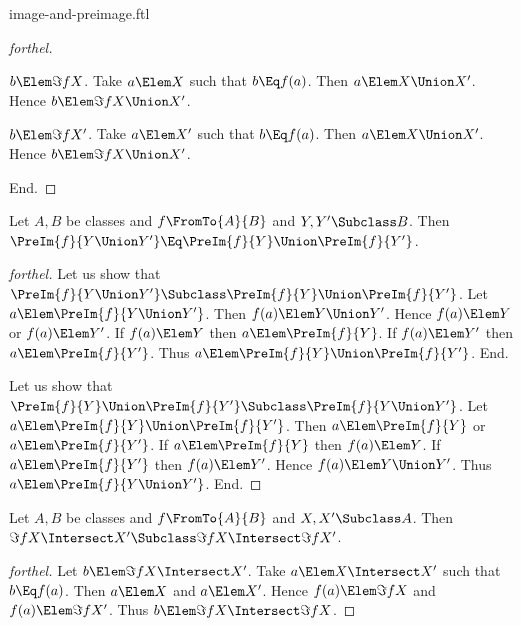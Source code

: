 \documentclass{stex}
\begin{document}
\begin{smodule}{image-and-preimage.ftl}
\begin{proof}[forthel]
    \begin{case}{$b \Elem \Im{f}{X}$.}
      Take $a \Elem X$ such that $b \Eq f(a)$.
      Then $a \Elem X \Union X'$.
      Hence $b \Elem \Im{f}{X \Union X'}$.
    \end{case}

    \begin{case}{$b \Elem \Im{f}{X'}$.}
      Take $a \Elem X'$ such that $b \Eq f(a)$.
      Then $a \Elem X \Union X'$.
      Hence $b \Elem \Im{f}{X \Union X'}$.
    \end{case}
  End.
\end{proof}

\begin{proposition*}[forthel]
  Let $A, B$ be classes and $f \FromTo{A}{B}$ and $Y, Y' \Subclass B$.
  Then $\PreIm{f}{Y \Union Y'} \Eq \PreIm{f}{Y} \Union \PreIm{f}{Y'}$.
\end{proposition*}
\begin{proof}[forthel]
  Let us show that $\PreIm{f}{Y \Union Y'} \Subclass \PreIm{f}{Y} \Union \PreIm{f}{Y'}$.
    Let $a \Elem \PreIm{f}{Y \Union Y'}$.
    Then $f(a) \Elem Y \Union Y'$.
    Hence $f(a) \Elem Y$ or $f(a) \Elem Y'$.
    If $f(a) \Elem Y$ then $a \Elem \PreIm{f}{Y}$.
    If $f(a) \Elem Y'$ then $a \Elem \PreIm{f}{Y'}$.
    Thus $a \Elem \PreIm{f}{Y} \Union \PreIm{f}{Y'}$.
  End.

  Let us show that $\PreIm{f}{Y} \Union \PreIm{f}{Y'} \Subclass \PreIm{f}{Y \Union Y'}$.
    Let $a \Elem \PreIm{f}{Y} \Union \PreIm{f}{Y'}$.
    Then $a \Elem \PreIm{f}{Y}$ or $a \Elem \PreIm{f}{Y'}$.
    If $a \Elem \PreIm{f}{Y}$ then $f(a) \Elem Y$.
    If $a \Elem \PreIm{f}{Y'}$ then $f(a) \Elem Y'$.
    Hence $f(a) \Elem Y \Union Y'$.
    Thus $a \Elem \PreIm{f}{Y \Union Y'}$.
  End.
\end{proof}

\begin{proposition*}[forthel]
  Let $A, B$ be classes and $f \FromTo{A}{B}$ and $X, X' \Subclass A$.
  Then $\Im{f}{X \Intersect X'} \Subclass \Im{f}{X} \Intersect \Im{f}{X'}$.
\end{proposition*}
\begin{proof}[forthel]
  Let $b \Elem \Im{f}{X \Intersect X'}$.
  Take $a \Elem X \Intersect X'$ such that $b \Eq f(a)$.
  Then $a \Elem X$ and $a \Elem X'$.
  Hence $f(a) \Elem \Im{f}{X}$ and $f(a) \Elem \Im{f}{X'}$.
  Thus $b \Elem \Im{f}{X} \Intersect \Im{f}{X}$.
\end{proof}


\end{smodule}
\end{document}
